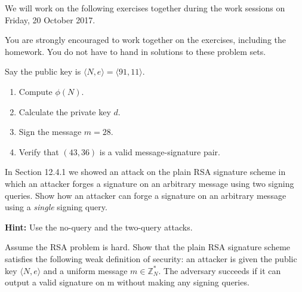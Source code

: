 \documentclass[a4paper,10pt,landscape,twocolumn]{scrartcl}
\newcommand\worksession{Friday, 20 October 2017}
\begin{document}
\problems

{\sffamily\noindent
We will work on the following exercises together during the work sessions on \worksession.

You are strongly encouraged to work together on the exercises, including the homework. You do not have to hand in solutions to these problem sets.}

\begin{exercise}
Say the public key is $\langle N,e \rangle=\langle 91,11\rangle$.
\begin{enumerate}
\item Compute $\phi(N)$.
\item Calculate the private key $d$.
\item Sign the message $m=28$.
\item Verify that $(43,36)$ is a valid message-signature pair.
\end{enumerate}

\end{exercise}


\begin{exercise}

In Section 12.4.1 we showed an attack on the
plain RSA signature scheme in which an attacker forges a signature
on an arbitrary message using two signing queries. Show how an
attacker can forge a signature on an arbitrary message using a
\emph{single} signing query.

\textbf{Hint:} Use the no-query and the two-query attacks. 
\end{exercise}


\begin{exercise}
Assume the RSA problem is hard. Show that the plain RSA signature
scheme satisfies the following weak definition of security: an attacker is
given the public key $\langle N, e\rangle$ and a uniform message $m \in \mathbb{Z}^*_N$. The adversary succeeds if it can output a valid signature on m without making
any signing queries.
\end{exercise}
\end{document}
